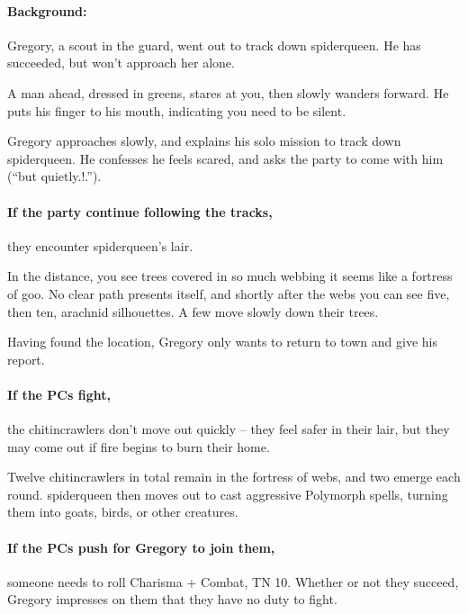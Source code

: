 \begin{multicols}{2}
\paragraph{Background:}
Gregory, a scout in the \gls{guard}, went out to track down \gls{spiderqueen}.
He has succeeded, but won't approach her alone.

\begin{boxtext}

  A man ahead, dressed in greens, stares at you, then slowly wanders forward.  He puts his finger to his mouth, indicating you need to be silent.

\end{boxtext}

Gregory approaches slowly, and explains his solo mission to track down \gls{spiderqueen}.
He confesses he feels scared, and asks the party to come with him (``but quietly.!.'').

\paragraph{If the party continue following the tracks,}
they encounter \gls{spiderqueen}'s lair.

\begin{boxtext}
  In the distance, you see trees covered in so much webbing it seems like a fortress of goo.
  No clear path presents itself, and shortly after the webs you can see five, then ten, arachnid silhouettes.
  A few move slowly down their trees.
\end{boxtext}

Having found the location, Gregory only wants to return to \gls{town} and give his report.

\paragraph{If the PCs fight,}
the chitincrawlers don't move out quickly -- they feel safer in their lair, but they may come out if fire begins to burn their home.

Twelve chitincrawlers in total remain in the fortress of webs, and two emerge each round.
\Gls{spiderqueen} then moves out to cast aggressive Polymorph spells, turning them into goats, birds, or other creatures.

\paragraph{If the PCs push for Gregory to join them,}
someone needs to roll Charisma + Combat, TN 10.
Whether or not they succeed, Gregory impresses on them that they have no duty to fight.


\end{multicols}

